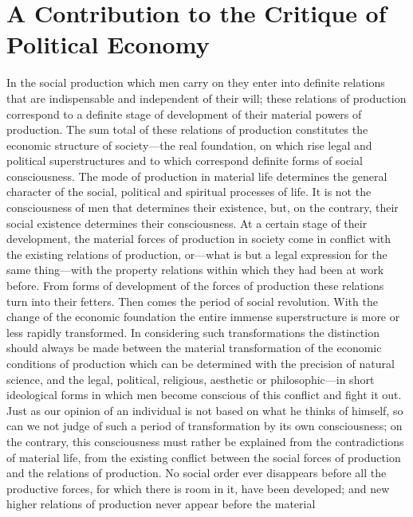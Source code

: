 
\author{Karl Marx}
\chapter[A Contribution to the Critique of Political Economy,
excerpt]{A Contribution to the Critique of Political Economy}

In the social production which men carry on they enter into
definite relations that are indispensable and independent of their
will; these relations of production correspond to a definite stage of
development of their material powers of production. The sum total of
these relations of production constitutes the economic structure of
society---the real foundation, on which rise legal and political
superstructures and to which correspond definite forms of social
consciousness. The mode of production in material life determines the
general character of the social, political and spiritual processes of
life. It is not the consciousness of men that determines their
existence, but, on the contrary, their social existence determines
 their consciousness. At a certain stage of their
development, the material forces of production in society come in
conflict with the existing relations of production, or---what is but a
legal expression for the same thing---with the property relations
within which they had been at work before. From forms of development
of the forces of production these relations turn into their fetters.
Then comes the period of social revolution. With the change of the
economic foundation the entire immense superstructure is more or less
rapidly transformed. In considering such transformations the
distinction should always be made between the material transformation
of the economic conditions of production which can be determined with
the precision of natural science, and the legal, political, religious,
aesthetic or philosophic---in short ideological forms in which men
become conscious of this conflict and fight it out. Just as our
opinion of an individual is not based on what he thinks of himself, so
can we not judge of such a period of transformation by its own
consciousness; on the contrary, this consciousness must rather be
explained from the contradictions of material life, from the existing
conflict between the social forces of production and the relations of
production. No social order ever disappears before all the productive
forces, for which there is room in it, have been developed; and new
higher relations of production never appear before the material
